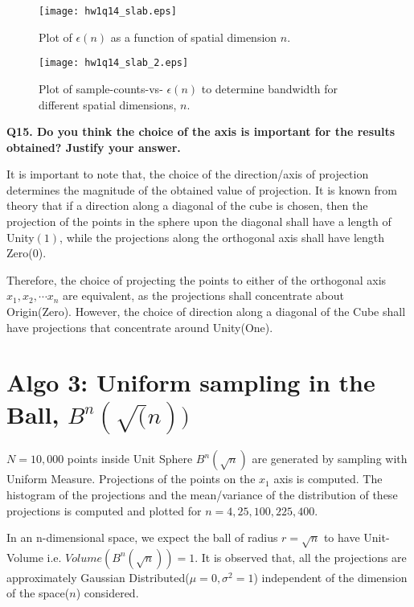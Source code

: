 \documentclass[11pt]{article}
\begin{document}
\begin{figure}[h!]
\centering
\texttt{[image: hw1q14\_slab.eps]}\\
\caption{Plot of $\epsilon(n)$ as a function of spatial dimension $n$.}
\label{fig:que14_slab}
\end{figure}

\begin{figure}[h!]
\centering
\texttt{[image: hw1q14\_slab\_2.eps]}\\
\caption{Plot of sample-counts-vs- $\epsilon(n)$ to determine bandwidth for different spatial dimensions, $n$.}
\label{fig:que14_slab_vary}
\end{figure}




\textbf{Q15. Do you think the choice of the axis is important for the results obtained? Justify your answer.}

It is important to note that, the choice of the direction/axis of projection determines the magnitude of the obtained value of projection. It is known from theory that if a direction along a diagonal of the cube is chosen, then the projection of the points in the sphere upon the diagonal shall have a length of Unity$(1)$, while the projections along the orthogonal axis shall have length Zero($0$).

Therefore, the choice of projecting the points to either of the orthogonal axis $x_1, x_2, \cdots x_n$ are equivalent, as the projections shall concentrate about Origin(Zero). However, the choice of direction along a diagonal of the Cube shall have projections that concentrate around Unity(One).

\section{Algo 3: Uniform sampling in the Ball, $B^n(\sqrt(n))$} 
 
$N = 10,000$ points inside Unit Sphere $B^n(\sqrt{n})$ are generated by sampling with Uniform Measure. Projections of the points on the $x_1$ axis is computed. The histogram of the projections and the mean/variance of the distribution of these projections is computed and plotted for $n = {4,25,100,225,400}$.

In an n-dimensional space, we expect the ball of radius $r=\sqrt{n}$ to have Unit-Volume i.e. $Volume(B^n(\sqrt{n})) = 1$. It is observed that, all the projections are approximately Gaussian Distributed($\mu=0, \sigma^2 = 1$) independent of the dimension of the space($n$) considered. 
\end{document}
